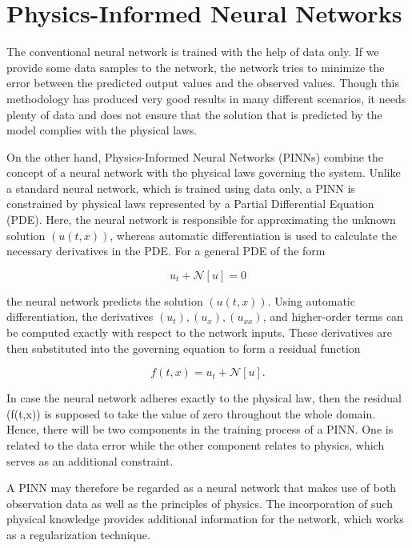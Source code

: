 \documentclass[11pt]{article}
\begin{document}
\section{Physics-Informed Neural Networks}


The conventional neural network is trained with the help of data only. If we provide some data samples to 
the network, the network tries to minimize the error between the predicted output values and the observed
values. Though this methodology has produced very good results in many different scenarios, it needs plenty 
of data and does not ensure that the solution that is predicted by the model complies with the physical laws.

On the other hand, Physics-Informed Neural Networks (PINNs) combine the concept of a neural network with the 
physical laws governing the system. Unlike a standard neural network, which is trained using data only, 
a PINN is constrained by physical laws represented by a Partial Differential Equation (PDE). 
Here, the neural network is responsible for approximating the unknown solution $(u(t,x))$, whereas automatic
differentiation is used to calculate the necessary derivatives in the PDE.
For a general PDE of the form

\begin{equation}
	u_t + \mathcal{N}[u] = 0
\end{equation}



the neural network predicts the solution $(u(t,x))$. Using automatic differentiation, 
the derivatives $(u_t), (u_x), (u_{xx})$, and higher-order terms can be computed exactly with respect to the network inputs. 
These derivatives are then substituted into the governing equation to form a residual function

\begin{equation}
	f(t,x) = u_t + \mathcal{N}[u].
\end{equation}

In case the neural network adheres exactly to the physical law, then the residual 
(f(t,x)) is supposed to take the value of zero throughout the whole domain. 
Hence, there will be two components in the training process of a PINN. 
One is related to the data error while the other component relates to physics, 
which serves as an additional constraint.

A PINN may therefore be regarded as a neural network that makes use of both 
observation data as well as the principles of physics. The incorporation of 
such physical knowledge provides additional information for the network, 
which works as a regularization technique.
\end{document}

